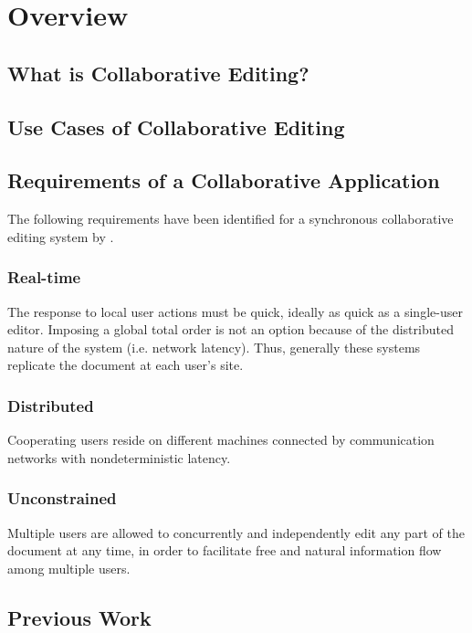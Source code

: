 \chapter{Overview}
\label{chapter:overview}



\section{What is Collaborative Editing?}



\section{Use Cases of Collaborative Editing}



\section{Requirements of a Collaborative Application}
The following requirements have been identified for a synchronous collaborative
editing system by \cite{sun98a}.

\subsection{Real-time} 
The response to local user actions must be quick, ideally
as quick as a single-user editor. Imposing a global total order is not
an option because of the distributed nature of the system (i.e. network
latency). Thus, generally these systems replicate the document at each
user's site.

\subsection{Distributed} 
Cooperating users reside on different machines 
connected by communication networks with nondeterministic latency.

\subsection{Unconstrained} 
Multiple users are allowed to concurrently and
independently edit any part of the document at any time, in order to 
facilitate free and natural information flow among multiple users.



\section{Previous Work}
\label{sect:overview.previouswork}

